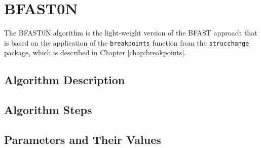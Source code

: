 \documentclass[main.tex]{subfiles}
\begin{document}
\chapter{BFAST0N}
\label{chap:bfast0n}
The BFAST0N algorithm is the light-weight version of the BFAST approach that is based on
the application of the \texttt{breakpoints} function from the
\texttt{strucchange} package, which is described in Chapter
\ref{chap:breakpoints}.
\section{Algorithm Description}
\label{sec:bfast0n_desc}
\section{Algorithm Steps}
\label{sec:algorithm_steps}
\section{Parameters and Their Values}
\label{sec:bfast0n_params}

\biblio
\end{document}
